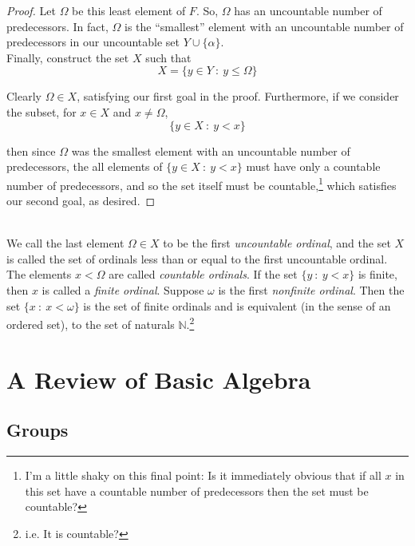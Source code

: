 \documentclass[12pt]{article}
\newlength\tindent
\renewcommand{\indent}{\hspace*{\tindent}}
\newcommand{\N}{\mathbb N}
\begin{document}
\begin{proof}
\indent Let $\Omega$ be this least element of $F$. So, $\Omega$ has an uncountable number of predecessors. In fact, $\Omega$ is the ``smallest'' element with an uncountable number of predecessors in our uncountable set $Y \cup \{\alpha\}$. \\

Finally, construct the set $X$ such that
\begin{equation*}
	X = \big\{ y \in Y ~:~ y \leq \Omega \big\}
\end{equation*}

\indent Clearly $\Omega \in X$, satisfying our first goal in the proof. Furthermore, if we consider the subset, for $x \in X$ and $x \neq \Omega$,
\begin{equation*}
	\{ y \in X ~:~ y < x \}
\end{equation*}

then since $\Omega$ was the smallest element with an uncountable number of predecessors, the all elements of $\{ y \in X ~:~ y < x \}$ must have only a countable number of predecessors, and so the set itself must be countable,\footnote{I'm a little shaky on this final point: Is it immediately obvious that if all $x$ in this set have a countable number of predecessors then the set must be countable?} which satisfies our second goal, as desired.
\end{proof} \hfill\\

\indent We call the last element $\Omega \in X$ to be the first {\em uncountable ordinal}, and the set $X$ is called the set of ordinals less than or equal to the first uncountable ordinal. The elements $x < \Omega$ are called {\em countable ordinals}. If the set $\{y ~:~ y < x\}$ is finite, then $x$ is called a {\em finite ordinal}. Suppose $\omega$ is the first {\em nonfinite ordinal}. Then the set $\{ x ~:~ x < \omega \}$ is the set of finite ordinals and is equivalent (in the sense of an ordered set), to the set of naturals $\N$.\footnote{i.e. It is countable?} \hfill\\

\section{A Review of Basic Algebra}

\subsection{Groups}
\end{document}
